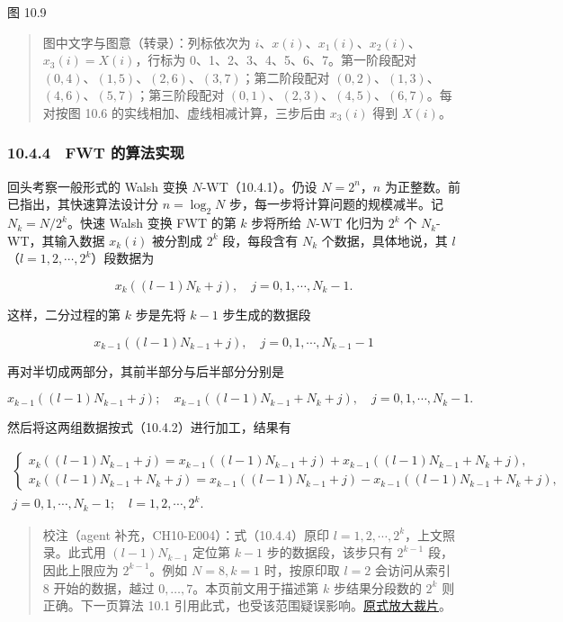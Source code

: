 \documentclass[
  10pt,
  fontset=fandol]{ctexart}
\begin{document}
图 10.9

\begin{quote}
图中文字与图意（转录）：列标依次为 \(i\)、\(x(i)\)、\(x_1(i)\)、\(x_2(i)\)、\(x_3(i)=X(i)\)，行标为 0、1、2、3、4、5、6、7。第一阶段配对 \((0,4)\)、\((1,5)\)、\((2,6)\)、\((3,7)\)；第二阶段配对 \((0,2)\)、\((1,3)\)、\((4,6)\)、\((5,7)\)；第三阶段配对 \((0,1)\)、\((2,3)\)、\((4,5)\)、\((6,7)\)。每对按图 10.6 的实线相加、虚线相减计算，三步后由 \(x_3(i)\) 得到 \(X(i)\)。
\end{quote}

\subsubsection{10.4.4　FWT 的算法实现}\label{fwt-ux7684ux7b97ux6cd5ux5b9eux73b0}

回头考察一般形式的 Walsh 变换 \(N\)-WT（10.4.1）。仍设 \(N=2^n\)，\(n\) 为正整数。前已指出，其快速算法设计分 \(n=\log_2N\) 步，每一步将计算问题的规模减半。记 \(N_k=N/2^k\)。快速 Walsh 变换 FWT 的第 \(k\) 步将所给 \(N\)-WT 化归为 \(2^k\) 个 \(N_k\)-WT，其输入数据 \(x_k(i)\) 被分割成 \(2^k\) 段，每段含有 \(N_k\) 个数据，具体地说，其 \(l\)（\(l=1,2,\cdots,2^k\)）段数据为

\[
x_k((l-1)N_k+j),\quad j=0,1,\cdots,N_k-1.
\]

这样，二分过程的第 \(k\) 步是先将 \(k-1\) 步生成的数据段

\[
x_{k-1}((l-1)N_{k-1}+j),\quad j=0,1,\cdots,N_{k-1}-1
\]

再对半切成两部分，其前半部分与后半部分分别是

\[
x_{k-1}((l-1)N_{k-1}+j);\quad x_{k-1}((l-1)N_{k-1}+N_k+j),\quad j=0,1,\cdots,N_k-1.
\]

然后将这两组数据按式（10.4.2）进行加工，结果有

\[
\begin{gathered}
\begin{cases}
x_k((l-1)N_{k-1}+j)=x_{k-1}((l-1)N_{k-1}+j)+x_{k-1}((l-1)N_{k-1}+N_k+j),\\
x_k((l-1)N_{k-1}+N_k+j)=x_{k-1}((l-1)N_{k-1}+j)-x_{k-1}((l-1)N_{k-1}+N_k+j),
\end{cases}\\
j=0,1,\cdots,N_k-1;\quad l=1,2,\cdots,2^k.
\end{gathered}
\tag{10.4.4}
\]

\begin{quote}
校注（agent 补充，CH10-E004）：式（10.4.4）原印 \(l=1,2,\cdots,2^k\)，上文照录。此式用 \((l-1)N_{k-1}\) 定位第 \(k-1\) 步的数据段，该步只有 \(2^{k-1}\) 段，因此上限应为 \(2^{k-1}\)。例如 \(N=8,k=1\) 时，按原印取 \(l=2\) 会访问从索引 8 开始的数据，越过 \(0,\ldots,7\)。本页前文用于描述第 \(k\) 步结果分段数的 \(2^k\) 则正确。下一页算法 10.1 引用此式，也受该范围疑误影响。\href{../assets/ch10/erratum-p274-range.png}{原式放大裁片}。
\end{quote}
\end{document}
